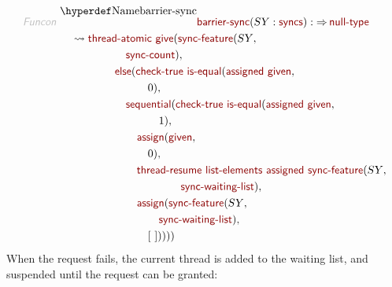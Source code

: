 \begin{align*}
  \KEY{Funcon} ~ 
  & \NAMEDECL{barrier-sync}(\VAR{SY} : \NAME{syncs}) :  \TO \NAME{null-type} \\
  & \quad \leadsto \NAME{thread-atomic} ~
                     \NAME{give}
                       ( \NAME{sync-feature}
                           ( \VAR{SY}, \\&\quad \quad \quad \quad \quad \quad 
                             \NAME{sync-count} ), \\&\quad \quad \quad \quad \quad 
                         \NAME{else}
                           ( \NAME{check-true} ~
                               \NAME{is-equal}
                                 ( \NAME{assigned} ~
                                     \NAME{given}, \\&\quad \quad \quad \quad \quad \quad \quad \quad 
                                   0 ), \\&\quad \quad \quad \quad \quad \quad 
                             \NAME{sequential}
                               ( \NAME{check-true} ~
                                   \NAME{is-equal}
                                     ( \NAME{assigned} ~
                                         \NAME{given}, \\&\quad \quad \quad \quad \quad \quad \quad \quad \quad 
                                       1 ), \\&\quad \quad \quad \quad \quad \quad \quad 
                                 \NAME{assign}
                                   ( \NAME{given}, \\&\quad \quad \quad \quad \quad \quad \quad \quad 
                                     0 ), \\&\quad \quad \quad \quad \quad \quad \quad 
                                 \NAME{thread-resume} ~
                                   \NAME{list-elements} ~
                                     \NAME{assigned} ~
                                       \NAME{sync-feature}
                                         ( \VAR{SY}, \\&\quad \quad \quad \quad \quad \quad \quad \quad \quad \quad \quad 
                                           \NAME{sync-waiting-list} ), \\&\quad \quad \quad \quad \quad \quad \quad 
                                 \NAME{assign}
                                   ( \NAME{sync-feature}
                                       ( \VAR{SY}, \\&\quad \quad \quad \quad \quad \quad \quad \quad \quad 
                                         \NAME{sync-waiting-list} ), \\&\quad \quad \quad \quad \quad \quad \quad \quad 
                                     [  ~  ] ) ) ) )
\end{align*}
When the request fails, the current thread is added to the waiting list, and
suspended until the request can be granted:


